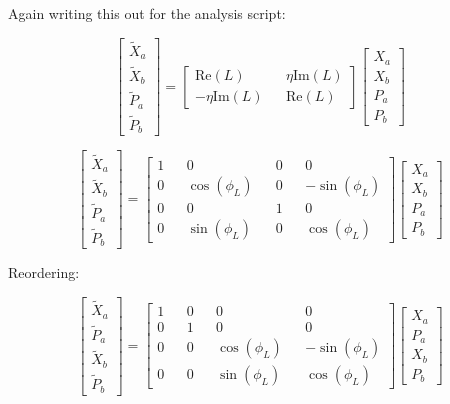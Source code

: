 \documentclass[12pt]{article}
\begin{document}
Again writing this out for the analysis script:

\begin{equation}
\begin{bmatrix}
\tilde{X}_a\\\tilde{X}_b\\\tilde{P}_a\\\tilde{P}_b
\end{bmatrix}
=
\begin{bmatrix}
\text{Re}(L) && \eta\text{Im}(L)\\
-\eta\text{Im}(L) && \text{Re}(L)
\end{bmatrix}
\begin{bmatrix}
X_a\\X_b\\P_a\\P_b
\end{bmatrix}
\end{equation}

\begin{equation}
\begin{bmatrix}
\tilde{X}_a\\\tilde{X}_b\\\tilde{P}_a\\\tilde{P}_b
\end{bmatrix}
=
\begin{bmatrix}
1 && 0 && 0 && 0\\
0 && \cos(\phi_L) && 0 && -\sin(\phi_L)\\
0 && 0 && 1 && 0\\
0 && \sin(\phi_L) && 0 && \cos(\phi_L)
\end{bmatrix}
\begin{bmatrix}
X_a\\X_b\\P_a\\P_b
\end{bmatrix}
\end{equation}

Reordering:

\begin{equation}
\begin{bmatrix}
\tilde{X}_a\\\tilde{P}_a\\\tilde{X}_b\\\tilde{P}_b
\end{bmatrix}
=
\begin{bmatrix}
1 && 0 && 0 && 0\\
0 && 1 && 0 && 0\\
0 && 0 && \cos(\phi_L) && -\sin(\phi_L)\\
0 && 0 && \sin(\phi_L) && \cos(\phi_L)
\end{bmatrix}
\begin{bmatrix}
X_a\\P_a\\X_b\\P_b
\end{bmatrix}
\end{equation}
\end{document}
